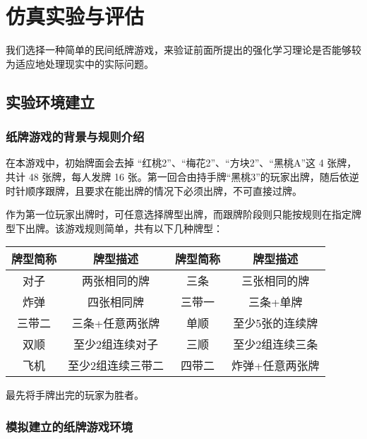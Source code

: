 
\chapter{仿真实验与评估}

我们选择一种简单的民间纸牌游戏，来验证前面所提出的强化学习理论是否能够较为适应地处理现实中的实际问题。

\section{实验环境建立}

\subsection{纸牌游戏的背景与规则介绍}

在本游戏中，初始牌面会去掉 “红桃2”、“梅花2”、“方块2”、“黑桃A”这 4 张牌，共计 48 张牌，每人发牌 16 张。第一回合由持手牌“黑桃3”的玩家出牌，随后依逆时针顺序跟牌，且要求在能出牌的情况下必须出牌，不可直接过牌。

作为第一位玩家出牌时，可任意选择牌型出牌，而跟牌阶段则只能按规则在指定牌型下出牌。该游戏规则简单，共有以下几种牌型：

\begin{center}
\begin{tabular}{|c|c|c|c|}
    \hline
    牌型简称 & 牌型描述 & 牌型简称 & 牌型描述 \\
    \hline
    对子 & 两张相同的牌 & 三条 & 三张相同的牌 \\
    \hline
    炸弹 & 四张相同牌 & 三带一 & 三条+单牌 \\
    \hline
    三带二 & 三条+任意两张牌 & 单顺 & 至少5张的连续牌 \\
    \hline
    双顺 & 至少2组连续对子 & 三顺 & 至少2组连续三条 \\
    \hline
    飞机 & 至少2组连续三带二 & 四带二 & 炸弹+任意两张牌\\
    \hline
\end{tabular}

\end{center}

最先将手牌出完的玩家为胜者。

\subsection{模拟建立的纸牌游戏环境}

